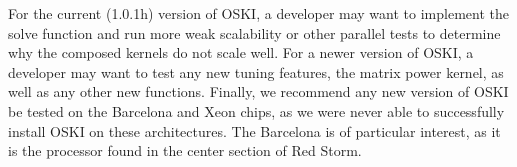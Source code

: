 For the current (1.0.1h) version of OSKI, a developer may want to implement the solve function
and run more weak scalability or other parallel tests to determine why the composed kernels do not scale
well.
For a newer version of OSKI,
a developer may want to test any new tuning features,
the matrix power kernel, as well as any other new functions.
Finally, we recommend  any new version of OSKI be tested
on the Barcelona and Xeon chips, as we were never able to successfully install OSKI on these
architectures.
The Barcelona is of particular interest, as it is the processor found in the center section of Red Storm.
